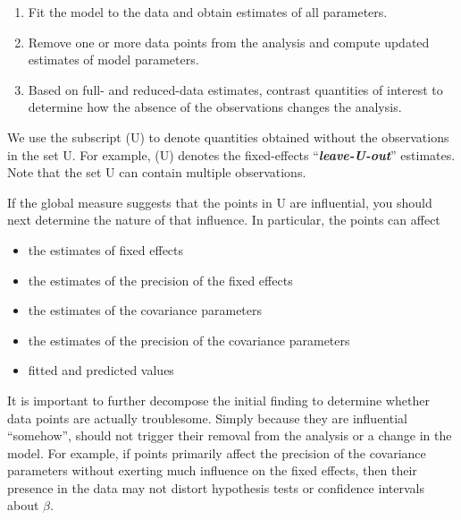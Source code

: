 \documentclass[12pt, a4paper]{report}
\theoremstyle{plain}
\theoremstyle{definition}
\theoremstyle{remark}
\begin{document}
\begin{enumerate}
	\item Fit the model to the data and obtain estimates of all parameters.
	\item Remove one or more data points from the analysis and compute updated estimates of model parameters.
	\item Based on full- and reduced-data estimates, contrast quantities of interest to determine how the absence
	of the observations changes the analysis.
\end{enumerate}
We use the subscript (U) to denote quantities obtained without the observations in the set U. For example,
(U) denotes the fixed-effects “\textit{\textbf{leave-U-out}}” estimates. Note that the set U can contain multiple observations.


If the global measure suggests that the points in U are influential, you should next determine the nature of
that influence. In particular, the points can affect
\begin{itemize}
	\item the estimates of fixed effects
	\item the estimates of the precision of the fixed effects
	\item the estimates of the covariance parameters
	\item the estimates of the precision of the covariance parameters
	\item fitted and predicted values
\end{itemize}

It is important to further decompose the initial finding to determine whether data points are actually troublesome.
Simply because they are influential “somehow”, should not trigger their removal from the analysis or
a change in the model. For example, if points primarily affect the precision of the covariance parameters
without exerting much influence on the fixed effects, then their presence in the data may not distort hypothesis
tests or confidence intervals about $\beta$.

\end{document}
